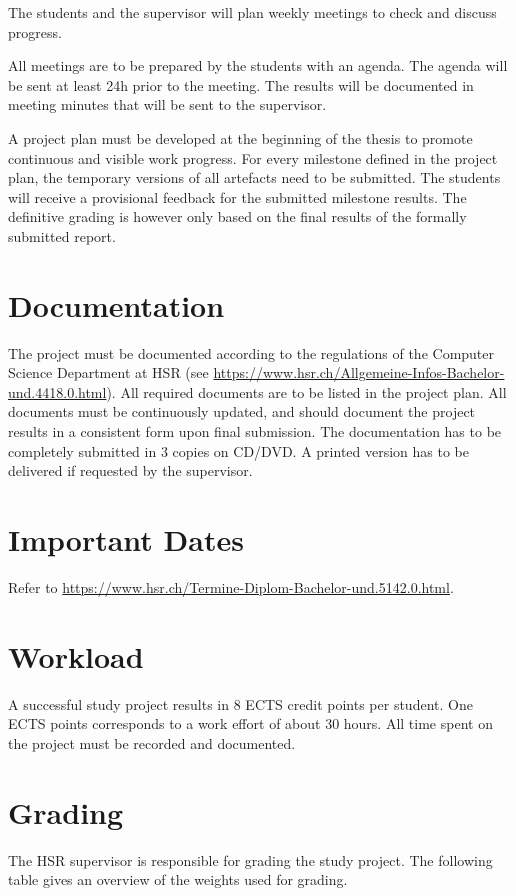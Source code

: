 \documentclass[a4paper]{article}
\begin{document}
The students and the supervisor will plan weekly meetings to check and discuss progress.

All meetings are to be prepared by the students with an agenda. The agenda will be sent at least 24h prior to the meeting. The results will be documented in meeting minutes that will be sent to the supervisor.

A project plan must be developed at the beginning of the thesis to promote continuous and visible work progress. For every milestone defined in the project plan, the temporary versions of all artefacts need to be submitted. The students will receive a provisional feedback for the submitted milestone results. The definitive grading is however only based on the final results of the formally submitted report.

\section{Documentation}
The project must be documented according to the regulations of the Computer Science Department at HSR (see \url{https://www.hsr.ch/Allgemeine-Infos-Bachelor-und.4418.0.html}). All required documents are to be listed in the project plan. All documents must be continuously updated, and should document the project results in a consistent form upon final submission. The documentation has to be completely submitted in 3 copies on CD/DVD. A printed version has to be delivered if requested by the supervisor.

\section{Important Dates}
Refer to \url{https://www.hsr.ch/Termine-Diplom-Bachelor-und.5142.0.html}.

\section{Workload}
A successful study project results in 8 ECTS credit points per student. One ECTS points corresponds to a work effort of about 30 hours. All time spent on the project must be recorded and documented.

\section{Grading}
The HSR supervisor is responsible for grading the study project. The following table gives an overview of the weights used for grading.
\end{document}
